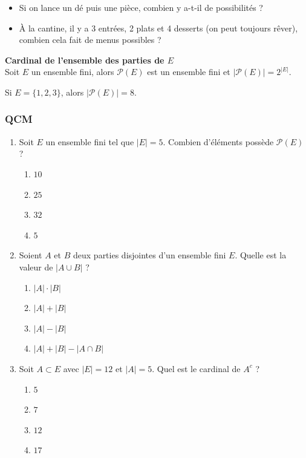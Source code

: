 \documentclass[../PolyS4.tex]{subfiles}
\begin{document}
\begin{Ex}
\begin{itemize}
    \item Si on lance un dé puis une pièce, combien y a-t-il de possibilités ?
    \item À la cantine, il y a 3 entrées, 2 plats et 4 desserts (on peut toujours rêver), combien cela fait de menus possibles ?\\
\end{itemize}
\end{Ex}

\begin{Prop}\textbf{Cardinal de l'ensemble des parties de $E$}\\

Soit $E$ un ensemble fini, alors $\mathcal{P}(E)$ est un ensemble fini et $|\mathcal{P}(E)| = 2^{|E|}$.\\
\end{Prop}

\begin{Ex} Si $E = \{1, 2, 3\}$, alors $|\mathcal{P}(E)| = 8$.
\end{Ex}


\subsubsection*{QCM}

\begin{enumerate}
\item Soit $E$ un ensemble fini tel que $|E| = 5$. Combien d'éléments possède $\mathcal{P}(E)$ ?
\begin{enumerate}
\item $10$
\item $25$
\item $32$
\item $5$
\end{enumerate}

\item Soient $A$ et $B$ deux parties disjointes d'un ensemble fini $E$. Quelle est la valeur de $|A \cup B|$ ?
\begin{enumerate}
\item $|A| \cdot |B|$
\item $|A| + |B|$
\item $|A| - |B|$
\item $|A| + |B| - |A \cap B|$
\end{enumerate}

\item Soit $A \subset E$ avec $|E| = 12$ et $|A| = 5$. Quel est le cardinal de $A^c$ ?
\begin{enumerate}
\item $5$
\item $7$
\item $12$
\item $17$
\end{enumerate}
\end{enumerate}
\end{document}
